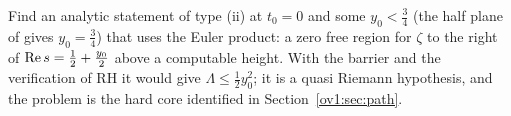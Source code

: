\begin{problem}\label{barrier:prob:tail}
Find an analytic statement of type (ii) at $t_0=0$ and some $y_0<\frac34$ (the half plane of \cite{OAI26a} gives $y_0=\frac34$) that uses the Euler product: a zero free region for $\zeta$ to the right of $\operatorname{Re} s=\frac12+\frac{y_0}2$ above a computable height. With the barrier and the verification of RH it would give $\Lambda\le\frac12y_0^2$; it is a quasi Riemann hypothesis, and the problem is the hard core identified in Section~\ref{ov1:sec:path}.
\end{problem}

